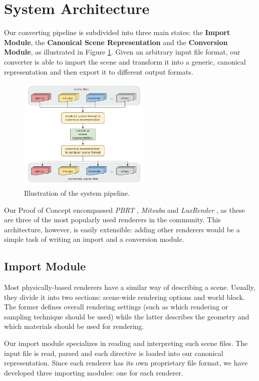 \section{System Architecture}
Our converting pipeline is subdivided into three main states: the \textbf{Import 
Module}, the \textbf{Canonical Scene Representation} and the \textbf{Conversion 
Module}, as illustrated in Figure \ref{fig:sysarch}. Given an arbitrary input 
file format, our converter is able to import the scene and transform it into a 
generic, canonical representation and then export it to different output 
formats. 

\begin{figure}[h]
\centering
\includegraphics[width=2.5in]{figs/3_system_architecture/architecture.png}
\caption{Illustration of the system pipeline.}
\label{fig:sysarch}
\end{figure}

Our Proof of Concept encompassed \textit{PBRT} \cite{pbrt}, \textit{Mitsuba} 
\cite{mitsuba} and \textit{LuxRender} \cite{luxrender}, as these are three of 
the most popularly used renderers in the community. This architecture, however, 
is easily extensible: adding other renderers would be a simple task of writing 
an import and a conversion module.

\subsection{Import Module}
Most physically-based renderers have a similar way of describing a scene. 
Usually, they divide it into two sections: scene-wide rendering options and 
world block. The former defines overall rendering settings (such as which 
rendering or sampling technique should be used) while the latter describes the 
geometry and which materials should be used for rendering.

Our import module specializes in reading and interpreting such scene files. The 
input file is read, parsed and each directive is loaded into our canonical  
representation. Since each renderer has its own proprietary file format, we have 
developed three importing modules: one for each renderer.

